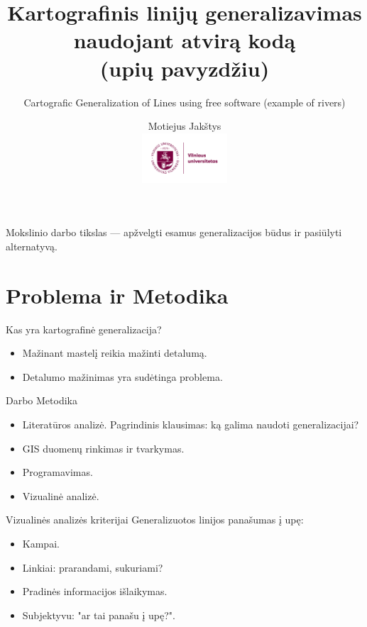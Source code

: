 \documentclass[14pt]{beamer}
\title{
    Kartografinis linijų generalizavimas naudojant atvirą kodą \\
    (upių pavyzdžiu)
}
\subtitle{
    \vspace{2em}
    Cartografic Generalization of Lines using free software (example of rivers)
}
\author{Motiejus Jakštys \\
    \includegraphics[height=5em]{../../misc/Logo_vilniaus_universitetas}
}
\begin{document}

\begin{frame}
\titlepage
\end{frame}

\begin{frame}
    Mokslinio darbo tikslas --- apžvelgti esamus generalizacijos būdus ir pasiūlyti
      alternatyvą.
\end{frame}

\section{Problema ir Metodika}

\begin{frame}{Kas yra kartografinė generalizacija?}
    \begin{itemize}[<+->]
        \item Mažinant mastelį reikia mažinti detalumą.
        \item Detalumo mažinimas yra sudėtinga problema.
    \end{itemize}
\end{frame}

\begin{frame}{Darbo Metodika}
    \begin{itemize}[<+->]
        \item Literatūros analizė. Pagrindinis klausimas: ką galima naudoti
            generalizacijai?
        \item GIS duomenų rinkimas ir tvarkymas.
        \item Programavimas.
        \item Vizualinė analizė.
    \end{itemize}
\end{frame}

\begin{frame}{Vizualinės analizės kriterijai}
    \pause
    Generalizuotos linijos panašumas į upę:
    \begin{itemize}[<+->]
        \item Kampai.
        \item Linkiai: prarandami, sukuriami?
        \item Pradinės informacijos išlaikymas.
        \item Subjektyvu: "ar tai panašu į upę?".
    \end{itemize}
\end{frame}
\end{document}
